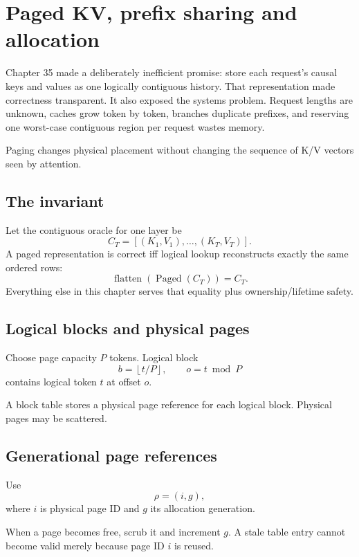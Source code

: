 \chapter{Paged KV, prefix sharing and allocation}

Chapter 35 made a deliberately inefficient promise: store each request's causal keys and values as one logically contiguous history. That representation made correctness transparent. It also exposed the systems problem. Request lengths are unknown, caches grow token by token, branches duplicate prefixes, and reserving one worst-case contiguous region per request wastes memory.

Paging changes physical placement without changing the sequence of K/V vectors seen by attention.

\section{The invariant}
Let the contiguous oracle for one layer be
\[
C_T=[(K_1,V_1),\ldots,(K_T,V_T)].
\]
A paged representation is correct iff logical lookup reconstructs exactly the same ordered rows:
\[
\operatorname{flatten}(\operatorname{Paged}(C_T))=C_T.
\]
Everything else in this chapter serves that equality plus ownership/lifetime safety.

\section{Logical blocks and physical pages}
Choose page capacity $P$ tokens. Logical block
\[
b=\left\lfloor t/P\right\rfloor,\qquad o=t\bmod P
\]
contains logical token $t$ at offset $o$.

A block table stores a physical page reference for each logical block. Physical pages may be scattered.

\section{Generational page references}
Use
\[
\rho=(i,g),
\]
where $i$ is physical page ID and $g$ its allocation generation.

When a page becomes free, scrub it and increment $g$. A stale table entry cannot become valid merely because page ID $i$ is reused.

